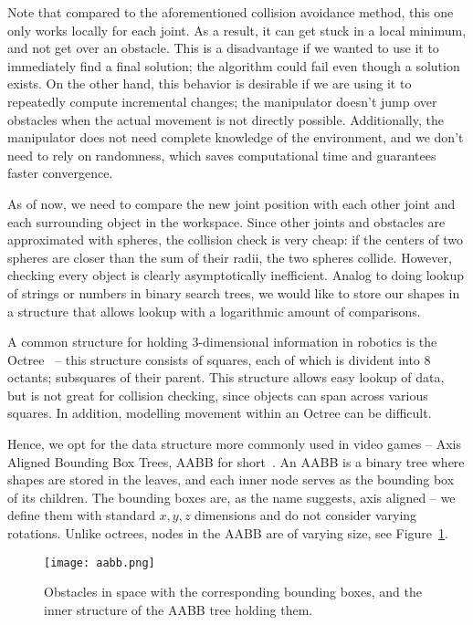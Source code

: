 Note that compared to the aforementioned collision avoidance method, this one only works locally for each joint. As a result, it can get stuck in a local minimum, and not get over an obstacle. This is a disadvantage if we wanted to use it to immediately find a final solution; the algorithm could fail even though a solution exists. On the other hand, this behavior is desirable if we are using it to repeatedly compute incremental changes; the manipulator doesn't jump over obstacles when the actual movement is not directly possible. Additionally, the manipulator does not need complete knowledge of the environment, and we don't need to rely on randomness, which saves computational time and guarantees faster convergence.

As of now, we need to compare the new joint position with each other joint and each surrounding object in the workspace. Since other joints and obstacles are approximated with spheres, the collision check is very cheap: if the centers of two spheres are closer than the sum of their radii, the two spheres collide. However, checking every object is clearly asymptotically inefficient. Analog to doing lookup of strings or numbers in binary search trees, we would like to store our shapes in a structure that allows lookup with a logarithmic amount of comparisons.

A common structure for holding 3-dimensional information in robotics is the Octree~\cite{octree} -- this structure consists of squares, each of which is divident into 8 octants; subsquares of their parent. This structure allows easy lookup of data, but is not great for collision checking, since objects can span across various squares. In addition, modelling movement within an Octree can be difficult.

Hence, we opt for the data structure more commonly used in video games -- Axis Aligned Bounding Box Trees, AABB for short~\cite{aabb}. An AABB is a binary tree where shapes are stored in the leaves, and each inner node serves as the bounding box of its children. The bounding boxes are, as the name suggests, axis aligned -- we define them with standard $x, y, z$ dimensions and do not consider varying rotations. Unlike octrees, nodes in the AABB are of varying size, see Figure~\ref{fig:aabb}.

\begin{figure}[h]
  \centering
  \texttt{[image: aabb.png]}
  \caption{Obstacles in space with the corresponding bounding boxes, and the inner structure of the AABB tree holding them.}\label{fig:aabb}
\end{figure}

